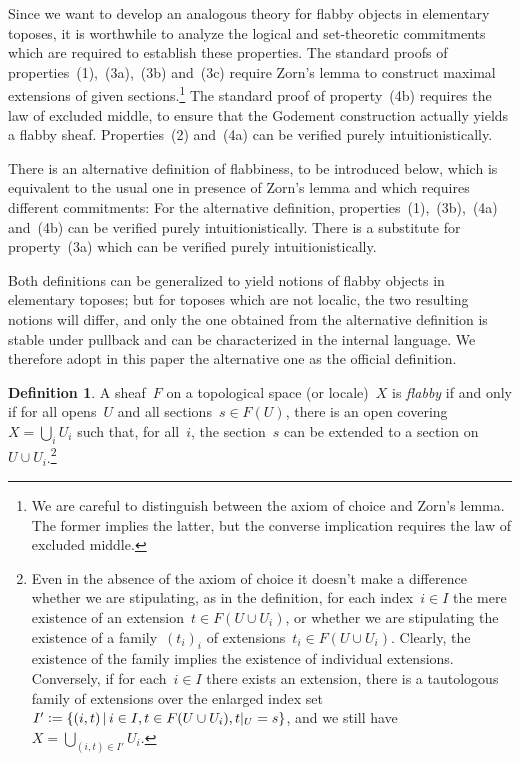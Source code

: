 \documentclass[oneside]{amsart}
\theoremstyle{definition}
\newtheorem{defn}{Definition}[section]
\theoremstyle{plain}
\theoremstyle{remark}
\newcommand{\defeq}{\vcentcolon=}
\renewcommand{\_}{\mathpunct{.}\,}
\begin{document}
Since we want to develop an analogous theory for flabby objects in elementary
toposes, it is worthwhile to analyze the logical and set-theoretic commitments
which are required to establish these properties. The standard proofs of
properties~(1),~(3a),~(3b) and~(3c) require Zorn's lemma to construct maximal
extensions of given sections.\footnote{We are careful to distinguish between
the axiom of choice and Zorn's lemma. The former implies the latter, but the
converse implication requires the law of excluded middle.}
The standard proof of property~(4b) requires the
law of excluded middle, to ensure that the Godement construction actually
yields a flabby sheaf. Properties~(2) and~(4a) can be verified purely
intuitionistically.

There is an alternative definition of flabbiness, to be introduced below, which
is equivalent to the usual one in presence of Zorn's lemma and which
requires different commitments: For the alternative definition,
properties~(1),~(3b),~(4a) and~(4b) can be verified purely intuitionistically.
There is a substitute for property~(3a) which can be verified purely
intuitionistically.

Both definitions can be generalized to yield notions of flabby objects in
elementary toposes; but for toposes which are not localic, the two resulting
notions will differ, and only the one obtained from the alternative definition
is stable under pullback and
can be characterized in the internal language. We therefore adopt in this paper the
alternative one as the official definition.

\begin{defn}\label{defn:flabby-sheaf}
A sheaf~$F$ on a topological space (or locale)~$X$ is \emph{flabby}
if and only if for all opens~$U$ and all sections~$s \in F(U)$, there is an
open covering~$X = \bigcup_i U_i$ such that, for all~$i$, the section~$s$ can
be extended to a section on~$U \cup U_i$.\footnote{Even in the absence of the
axiom of choice it doesn't make a difference
whether we are stipulating, as in the definition, for each index~$i \in I$ the mere
existence of an extension~$t \in F(U \cup U_i)$, or whether we are stipulating
the existence of a family~$(t_i)_i$ of extensions~$t_i \in F(U \cup U_i)$.
Clearly, the existence of the family implies the existence of individual
extensions. Conversely, if for each~$i \in I$ there exists an extension, there
is a tautologous family of extensions over the enlarged index set~$I' \defeq \{
(i,t) \,|\, i \in I, t \in F(U \cup U_i), t|_U = s \}$, and we still have~$X =
\bigcup_{(i,t) \in I'} U_i$.}
\end{defn}
\end{document}
